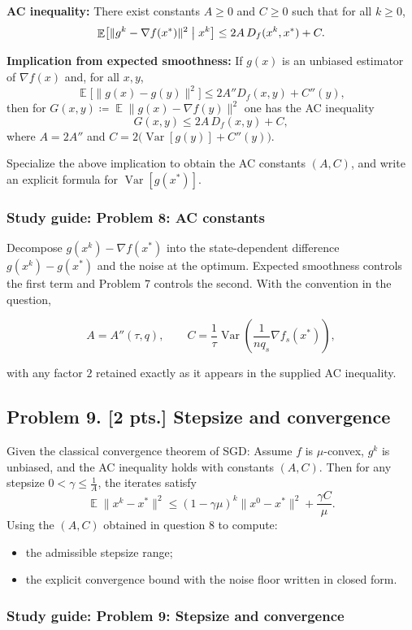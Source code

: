 \documentclass[11pt,a4paper]{article}
\DeclareMathOperator{\Var}{Var}
\DeclareMathOperator{\E}{\mathbb{E}}
\begin{document}
\textbf{AC inequality:} There exist constants $A \ge 0$ and $C \ge 0$ such that for all $k \ge 0$,
\[
\E\bigl[ \|g^{k} - \nabla f(x^{*})\|^{2} \bigm| x^{k} \bigr] \le 2A\, D_f(x^{k}, x^{*}) + C.
\]

\textbf{Implication from expected smoothness:} If $g(x)$ is an unbiased estimator of $\nabla f(x)$ and, for all $x, y$,
\[
\E\bigl[ \|g(x) - g(y)\|^{2} \bigr] \le 2A'' D_f(x, y) + C''(y),
\]
then for $G(x, y) \coloneqq \E\|g(x) - \nabla f(y)\|^{2}$ one has the AC inequality
\[
G(x, y) \le 2A\, D_f(x, y) + C,
\]
where $A = 2A''$ and $C = 2\bigl(\Var[g(y)] + C''(y)\bigr)$.

Specialize the above implication to obtain the AC constants $(A, C)$, and write an explicit formula for $\Var[g(x^{*})]$.


\subsubsection{Study guide: Problem 8: AC constants}

Decompose $g(x^k)-\nabla f(x^*)$ into the state-dependent difference $g(x^k)-g(x^*)$ and the noise at the optimum. Expected smoothness controls the first term and Problem 7 controls the second. With the convention in the question,

\[
A=A''(\tau,q),
\qquad
C=\frac1\tau\Var\left(\frac{1}{nq_s}\nabla f_s(x^*)\right),
\]

with any factor $2$ retained exactly as it appears in the supplied AC inequality.



\subsection{Problem 9. [2 pts.] Stepsize and convergence}
Given the classical convergence theorem of SGD: Assume $f$ is $\mu$-convex, $g^{k}$ is unbiased, and the AC inequality holds with constants $(A, C)$. Then for any stepsize $0 < \gamma \le \frac{1}{A}$, the iterates satisfy
\[
\E\|x^{k} - x^{*}\|^{2} \le (1 - \gamma\mu)^{k} \|x^{0} - x^{*}\|^{2} + \frac{\gamma C}{\mu}.
\]
Using the $(A, C)$ obtained in question 8 to compute:
\begin{itemize}
    \item the admissible stepsize range;
    \item the explicit convergence bound with the noise floor written in closed form.
\end{itemize}


\subsubsection{Study guide: Problem 9: Stepsize and convergence}
\end{document}
